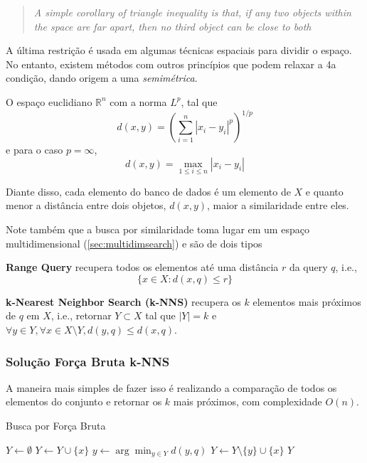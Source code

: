 \begin{quote}
    \it A simple corollary of triangle inequality is that, if any two objects within the space are far apart, then no third object can be close to both
\end{quote}

A última restrição é usada em algumas técnicas espaciais para dividir o espaço. No entanto, existem  métodos com outros princípios que podem relaxar a 4a condição, dando origem a uma \textit{semimétrica}.

\begin{example}
O espaço euclidiano $\mathbb{R}^n$ com a norma $L^p$, tal que
$$d(x, y) = \left(\sum_{i = 1}^n|x_i - y_i|^p\right)^{1/p}$$
e para o caso $p = \infty$,
$$d(x, y) = \max_{1 \le i \le n}|x_i - y_i|$$
\end{example}

Diante disso, cada elemento do banco de dados é um elemento de $X$ e quanto menor a distância entre dois objetos, $d(x, y)$, maior a similaridade entre eles.

Note também que a busca por similaridade toma lugar em um espaço multidimensional (\cref{sec:multidimsearch}) e são de dois tipos

\textbf{Range Query} recupera todos os elementos até uma distância $r$ da query $q$, i.e.,
$$\{x \in X : d(x, q) \le r\}$$

\textbf{k-Nearest Neighbor Search (k-NNS)} recupera os $k$ elementos mais próximos de $q$ em $X$, i.e., retornar $Y \subset X$ tal que $|Y| = k$ e $\forall y \in Y, \forall x \in X \setminus Y, d(y, q) \le d(x, q)$.

\subsubsection{Solução Força Bruta k-NNS}

A maneira mais simples de fazer isso é realizando a comparação de todos os elementos do conjunto e retornar os $k$ mais próximos, com complexidade $O(n)$.

\begin{algorithm}
\caption{Busca por Força Bruta}
\label{alg:bruteforce}
\begin{algorithmic}[1]
    \State $Y \gets \emptyset$
            \State $Y \gets Y \cup \{x\}$
        \Else
            \State $y \gets \arg\min_{y \in Y} d(y, q)$
                \State $Y \gets Y \setminus \{y\} \cup \{x\}$
            \EndIf
        \EndIf
    \EndFor
    \State \Return $Y$
\EndProcedure
\end{algorithmic}
\end{algorithm}


